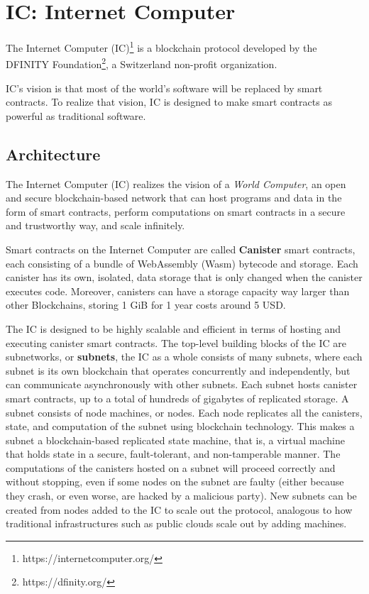 \section{IC: Internet Computer}
\label{sec:icp}

The Internet Computer (IC)\footnote{https://internetcomputer.org/} is a blockchain protocol developed by the DFINITY Foundation\footnote{https://dfinity.org/}, a Switzerland non-profit organization.  

IC's vision is that most of the world's software will be replaced by smart contracts. To realize that vision, IC is designed to make smart contracts as powerful as traditional software. \cite{icp-vision}

\subsection{Architecture}

The Internet Computer (IC) realizes the vision of a \textit{World Computer}, an open and secure blockchain-based network that can host programs and data in the form of smart contracts, perform computations on smart contracts in a secure and trustworthy way, and scale infinitely.\cite{icp-how-it-works}

Smart contracts on the Internet Computer are called \textbf{Canister} smart contracts, each consisting of a bundle of WebAssembly (Wasm) bytecode and storage. Each canister has its own, isolated, data storage that is only changed when the canister executes code. Moreover, canisters can have a storage capacity way larger than other Blockchains, storing 1 GiB for 1 year costs around 5 USD. \cite{icp-how-it-works}

The IC is designed to be highly scalable and efficient in terms of hosting and executing canister smart contracts. The top-level building blocks of the IC are subnetworks, or \textbf{subnets}, the IC as a whole consists of many subnets, where each subnet is its own blockchain that operates concurrently and independently, but can communicate asynchronously with other subnets. Each subnet hosts canister smart contracts, up to a total of hundreds of gigabytes of replicated storage. A subnet consists of node machines, or nodes. Each node replicates all the canisters, state, and computation of the subnet using blockchain technology. This makes a subnet a blockchain-based replicated state machine, that is, a virtual machine that holds state in a secure, fault-tolerant, and non-tamperable manner. The computations of the canisters hosted on a subnet will proceed correctly and without stopping, even if some nodes on the subnet are faulty (either because they crash, or even worse, are hacked by a malicious party). New subnets can be created from nodes added to the IC to scale out the protocol, analogous to how traditional infrastructures such as public clouds scale out by adding machines. \cite{icp-architecture}

